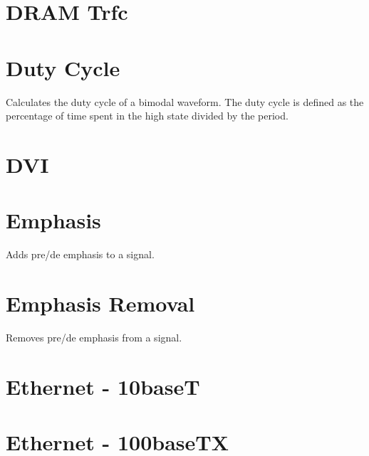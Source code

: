 \section{DRAM Trfc}

\pagebreak
\section{Duty Cycle}

Calculates the duty cycle of a bimodal waveform. The duty cycle is defined as the percentage of time spent in the high
state divided by the period.

\pagebreak
\section{DVI}
\label{filter:dvi}

\pagebreak
\section{Emphasis}

Adds pre/de emphasis to a signal.

\pagebreak
\section{Emphasis Removal}

Removes pre/de emphasis from a signal.

\pagebreak
\section{Ethernet - 10baseT}

\pagebreak
\section{Ethernet - 100baseTX}

